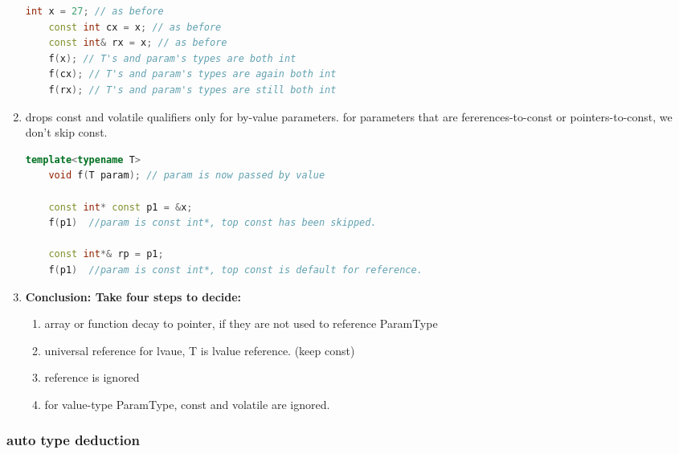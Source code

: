 \documentclass[a4paper,12pt,twoside]{book}
\begin{document}
\begin{enumerate}
\begin{lstlisting}[frame=single, language=c++]
	int x = 27; // as before
	const int cx = x; // as before
	const int& rx = x; // as before
	f(x); // T's and param's types are both int
	f(cx); // T's and param's types are again both int
	f(rx); // T's and param's types are still both int
	\end{lstlisting}
	
	\item  drops const and volatile qualifiers only for by-value parameters. for parameters that are fererences-to-const or pointers-to-const, we don't skip const.
	
\begin{lstlisting}[frame=single, language=c++]
	template<typename T>
	void f(T param); // param is now passed by value
	
	const int* const p1 = &x;
	f(p1)  //param is const int*, top const has been skipped. 
	
	const int*& rp = p1;
	f(p1)  //param is const int*, top const is default for reference. 
\end{lstlisting}
	
	\item \textbf{Conclusion:  Take four steps to decide:}
	\begin{enumerate}
		\item array or function decay to pointer, if they are not used to reference ParamType
		\item universal reference for lvaue, T is lvalue reference. (keep const)
		\item reference is ignored
		\item for value-type ParamType, const and volatile are ignored.
	\end{enumerate}
	
\end{enumerate}

\subsubsection{auto type deduction}
\end{document}
